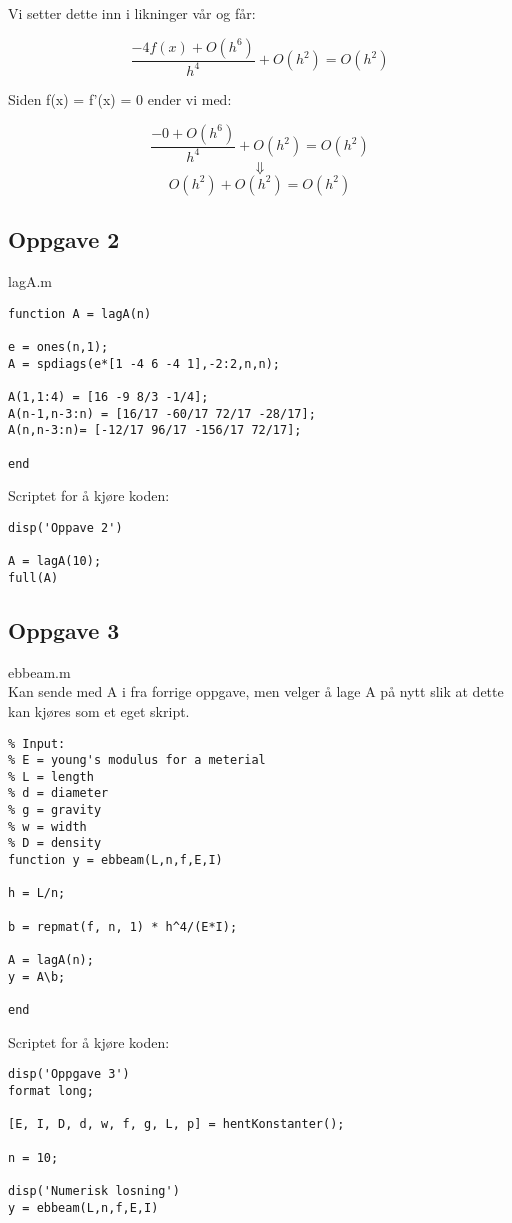 Vi setter dette inn i likninger vår og får:

\begin{equation*}
\frac{-4f(x) + O(h^6)}{h^4} + O(h^2) = O(h^2)
\end{equation*}

Siden f(x) = f'(x) = 0 ender vi med:


\begin{equation*}
\frac{-0+ O(h^6)}{h^4} + O(h^2) = O(h^2)
\end{equation*}
\begin{equation*}
\Downarrow
\end{equation*}
\begin{equation*}
O(h^2) + O(h^2) = O(h^2)
\end{equation*}

\subsection{Oppgave 2}

lagA.m
\begin{lstlisting}
function A = lagA(n)

e = ones(n,1);
A = spdiags(e*[1 -4 6 -4 1],-2:2,n,n);

A(1,1:4) = [16 -9 8/3 -1/4];
A(n-1,n-3:n) = [16/17 -60/17 72/17 -28/17];
A(n,n-3:n)= [-12/17 96/17 -156/17 72/17];

end
\end{lstlisting}

Scriptet for å kjøre koden:
\begin{lstlisting}
disp('Oppave 2')

A = lagA(10);
full(A)
\end{lstlisting}

\subsection{Oppgave 3}

ebbeam.m
\\
Kan sende med A i fra forrige oppgave, men velger å lage A på nytt slik at dette kan kjøres som et eget skript.
\begin{lstlisting}
% Input:
% E = young's modulus for a meterial
% L = length
% d = diameter
% g = gravity
% w = width
% D = density
function y = ebbeam(L,n,f,E,I)

h = L/n;

b = repmat(f, n, 1) * h^4/(E*I);

A = lagA(n);
y = A\b;

end

\end{lstlisting}
Scriptet for å kjøre koden:
\begin{lstlisting}
disp('Oppgave 3')
format long;

[E, I, D, d, w, f, g, L, p] = hentKonstanter();

n = 10;

disp('Numerisk losning')
y = ebbeam(L,n,f,E,I)
\end{lstlisting}

